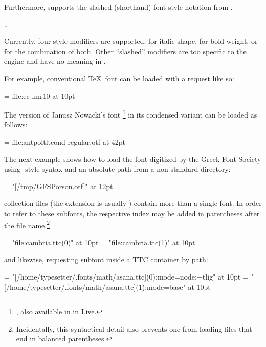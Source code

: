 Furthermore,  supports the slashed (shorthand)
font style notation from \XETEX.

\beginnarrower
  \nonproportional{\string\font\string\fontname\space= }%
  \nonproportional{/}%
  \dots
\endnarrower

\noindent
Currently, four style modifiers are supported:
   for italic shape,
   for bold   weight,
   or  for the combination of both.
%
Other “slashed” modifiers are too specific to the \XETEX engine and
have no meaning in \LUATEX.

\endsubsection



For example, conventional \TeX\ font can be loaded with a
 request like so:

\beginlisting
  \font \lmromanten = {file:ec-lmr10} at 10pt
\endlisting

The \OpenType version of Janusz Nowacki’s font \footnote{%
  \hyperlink {http://jmn.pl/antykwa-poltawskiego/}, also available in
  in \TEX Live.
}
in its condensed variant can be loaded as follows:

\beginlisting
  \font \apcregular = file:antpoltltcond-regular.otf at 42pt
\endlisting

The next example shows how to load the  font digitized by
the Greek Font Society using \XETEX-style syntax and an absolute path from a
non-standard directory:

\beginlisting
  \font \gfsporson = "[/tmp/GFSPorson.otf]" at 12pt
\endlisting

 collection files (the extension is usually
) contain more than a single font. In order to refer to these
subfonts, the respective index may be added in parentheses after the file
name.\footnote{%
  Incidentally, this syntactical detail also prevents one from loading files
  that end in balanced parentheses.
}

\beginlisting
  \font \cambriamain = "file:cambria.ttc(0)" at 10pt
  \font \cambriamath = "file:cambria.ttc(1)" at 10pt
\endlisting

and likewise, requesting subfont inside a TTC container by path:

\beginlisting
  \font \asanamain = "[/home/typesetter/.fonts/math/asana.ttc](0):mode=node;+tlig" at 10pt
  \font \asanamath = "[/home/typesetter/.fonts/math/asana.ttc](1):mode=base" at 10pt
\endlisting

